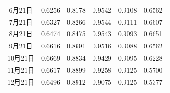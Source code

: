 \documentclass[withoutpreface,bwprint]{cumcmthesis}
\begin{document}
\begin{table}[!htbp]
\begin{tabular}{cccccc}
			6月21日  & 0.6256                                            & 0.8178                                            & 0.9542                                              & 0.9108                                            & 0.6562                                                          \\
			7月21日  & 0.6327                                            & 0.8266                                            & 0.9544                                              & 0.9111                                            & 0.6607                                                          \\
			8月21日  & 0.6474                                            & 0.8475                                            & 0.9543                                              & 0.9093                                            & 0.6651                                                          \\
			9月21日  & 0.6616                                            & 0.8691                                            & 0.9516                                              & 0.9088                                            & 0.6562                                                          \\
			10月21日 & 0.6669                                            & 0.8834                                            & 0.9429                                              & 0.9095                                            & 0.6228                                                          \\
			11月21日 & 0.6617                                            & 0.8899                                            & 0.9258                                              & 0.9125                                            & 0.5700                                                          \\
			12月21日 & 0.6496                                            & 0.8912                                            & 0.9075                                              & 0.9125                                            & 0.5377                                                          \\ \hline
		\end{tabular}
	\end{table}
\end{document}
